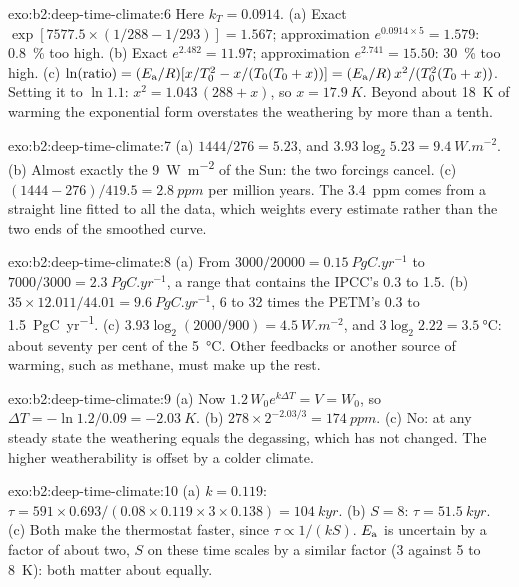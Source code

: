 \begin{solution}{exo:b2:deep-time-climate:6}
Here $k_T = 0.0914$. (a) Exact $\exp[7577.5\times(1/288 - 1/293)] = 1.567$; approximation
$e^{0.0914\times5} = 1.579$: \qty{0.8}{\percent} too high. (b) Exact $e^{2.482} = 11.97$;
approximation $e^{2.741} = 15.50$: \qty{30}{\percent} too high. (c) $\ln(\text{ratio}) = (E_{\text
a}/R)[x/T_0^2 - x/(T_0(T_0 + x))] = (E_{\text a}/R)\,x^2/(T_0^2(T_0 + x))$. Setting it to $\ln1.1$:
$x^2 = 1.043\,(288 + x)$, so $x = \qty{17.9}{K}$. Beyond about \qty{18}{K} of warming the
exponential form overstates the weathering by more than a tenth.
\end{solution}

\begin{solution}{exo:b2:deep-time-climate:7}
(a) $1444/276 = 5.23$, and $3.93\log_2 5.23 = \qty{9.4}{W.m^{-2}}$. (b) Almost exactly the
\qty{9}{W.m^{-2}} of the Sun: the two forcings cancel. (c) $(1444 - 276)/419.5 =
\qty{2.8}{ppm}$ per million years. The \qty{3.4}{ppm} comes from a straight line fitted to all the
data, which weights every estimate rather than the two ends of the smoothed curve.
\end{solution}

\begin{solution}{exo:b2:deep-time-climate:8}
(a) From $3000/20000 = \qty{0.15}{PgC.yr^{-1}}$ to $7000/3000 = \qty{2.3}{PgC.yr^{-1}}$, a range
that contains the IPCC's 0.3 to 1.5. (b) $35\times12.011/44.01 = \qty{9.6}{PgC.yr^{-1}}$, 6 to
32 times the PETM's 0.3 to \qty{1.5}{PgC.yr^{-1}}. (c) $3.93\log_2(2000/900) = \qty{4.5}{W.m^{-2}}$,
and $3\log_2 2.22 = \qty{3.5}{\celsius}$: about seventy per cent of the \qty{5}{\celsius}. Other
feedbacks or another source of warming, such as methane, must make up the rest.
\end{solution}

\begin{solution}{exo:b2:deep-time-climate:9}
(a) Now $1.2\,W_0e^{k\Delta T} = V = W_0$, so $\Delta T = -\ln 1.2/0.09 = \qty{-2.03}{K}$.
(b) $278\times2^{-2.03/3} = \qty{174}{ppm}$. (c) No: at any steady state the weathering equals the
degassing, which has not changed. The higher weatherability is offset by a colder climate.
\end{solution}

\begin{solution}{exo:b2:deep-time-climate:10}
(a) $k = 0.119$: $\tau = 591\times0.693/(0.08\times0.119\times3\times0.138) = \qty{104}{kyr}$.
(b) $S = 8$: $\tau = \qty{51.5}{kyr}$. (c) Both make the thermostat faster, since $\tau \propto
1/(kS)$. $E_{\text a}$ is uncertain by a factor of about two, $S$ on these time scales by a
similar factor (3 against 5 to \qty{8}{K}): both matter about equally.
\end{solution}

